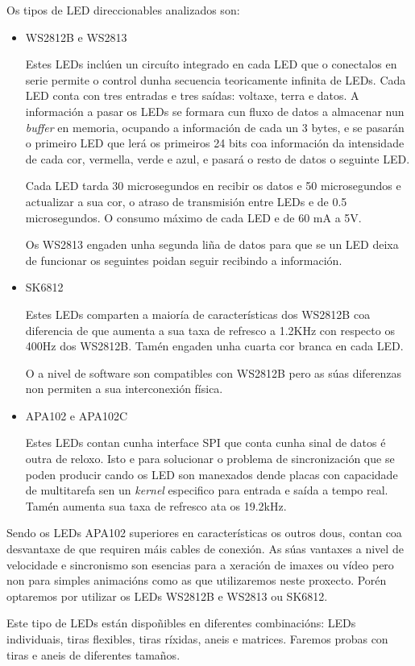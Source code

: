 Os tipos de LED direccionables analizados son:
\begin{itemize}
    \item WS2812B e WS2813

Estes LEDs inclúen un circuíto integrado en cada LED que o conectalos en serie permite o control dunha secuencia teoricamente infinita de LEDs. Cada LED conta con tres entradas e tres saídas: voltaxe, terra e datos. A información a pasar os LEDs se formara cun fluxo de datos a almacenar nun \emph{buffer} en memoria, ocupando a información de cada un 3 bytes, e se pasarán o primeiro LED que lerá os primeiros 24 bits coa información da intensidade de cada cor, vermella, verde e azul, e pasará o resto de datos o seguinte LED.

Cada LED tarda 30 microsegundos en recibir os datos e 50 microsegundos e actualizar a sua cor, o atraso de transmisión entre LEDs e de 0.5 microsegundos. O consumo máximo de cada LED e de 60 mA a 5V.

Os WS2813 engaden unha segunda liña de datos para que se un LED deixa de funcionar os seguintes poidan seguir recibindo a información.
    \item SK6812

Estes LEDs comparten a maioría de características dos WS2812B coa diferencia de que aumenta a sua taxa de refresco a 1.2KHz con respecto os 400Hz dos WS2812B. Tamén engaden unha cuarta cor branca en cada LED.

O a nivel de software son compatibles con WS2812B pero as súas diferenzas non permiten a sua interconexión física.
    \item APA102 e APA102C

Estes LEDs contan cunha interface SPI que conta cunha sinal de datos é outra de reloxo. Isto e para solucionar o problema de sincronización que se poden producir cando os LED son manexados dende placas con capacidade de multitarefa sen un \emph{kernel} especifico para entrada e saída a tempo real. Tamén aumenta sua taxa de refresco ata os 19.2kHz.
\end{itemize}

Sendo os LEDs APA102 superiores en características os outros dous, contan coa desvantaxe de que requiren máis cables de conexión. As súas vantaxes a nivel de velocidade e sincronismo son esencias para a xeración de imaxes ou vídeo pero non para simples animacións como as que utilizaremos neste proxecto. Porén optaremos por utilizar os LEDs WS2812B e WS2813 ou SK6812.

Este tipo de LEDs están dispoñibles en diferentes combinacións: LEDs individuais, tiras flexibles, tiras ríxidas, aneis e matrices. Faremos probas con tiras e aneis de diferentes tamaños.


